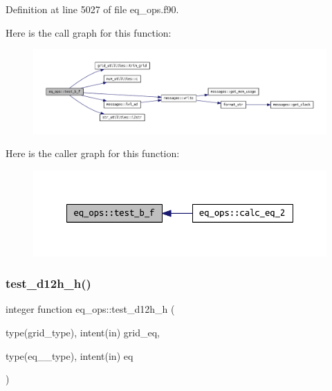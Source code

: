 Definition at line 5027 of file eq\+\_\+ops.\+f90.

Here is the call graph for this function\+:
\nopagebreak
\begin{figure}[H]
\begin{center}
\leavevmode
\includegraphics[width=350pt]{namespaceeq__ops_a8082c12510696bd8ffdd0deef41860c2_cgraph}
\end{center}
\end{figure}
Here is the caller graph for this function\+:
\nopagebreak
\begin{figure}[H]
\begin{center}
\leavevmode
\includegraphics[width=348pt]{namespaceeq__ops_a8082c12510696bd8ffdd0deef41860c2_icgraph}
\end{center}
\end{figure}
\mbox{\label{namespaceeq__ops_a003df1e1ab90dc6f586c3eed3dd067e8}} 
\subsubsection{\texorpdfstring{test\+\_\+d12h\+\_\+h()}{test\_d12h\_h()}}
{\footnotesize\ttfamily integer function eq\+\_\+ops\+::test\+\_\+d12h\+\_\+h (\begin{DoxyParamCaption}\item[{type(grid\+\_\+type), intent(in)}]{grid\+\_\+eq,  }\item[{type(eq\+\_\+2\+\_\+type), intent(in)}]{eq }\end{DoxyParamCaption})}



